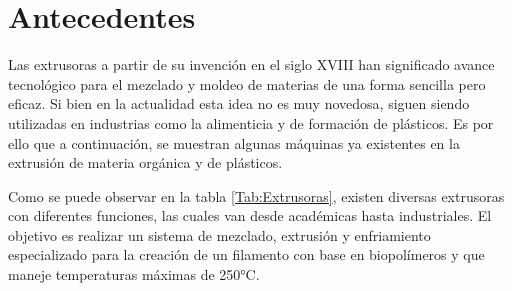 \documentclass[14pt,oneside]{extarticle} %
\begin{document}
\section{Antecedentes}

Las extrusoras a partir de su invención en el siglo XVIII han significado avance tecnológico para el mezclado y moldeo de materias de una forma sencilla pero eficaz. Si bien en la actualidad esta idea no es muy novedosa, siguen siendo utilizadas en industrias como la alimenticia y de formación de plásticos. Es por ello que a continuación, se muestran algunas máquinas ya existentes en la extrusión de materia orgánica y de plásticos.

Como se puede observar en la tabla \ref{Tab:Extrusoras}, existen diversas extrusoras con diferentes funciones, las cuales van desde académicas hasta industriales. El objetivo es realizar un sistema de mezclado, extrusión y enfriamiento especializado para la creación de un filamento con base en biopolímeros y que maneje temperaturas máximas de 250°C.
\end{document}

